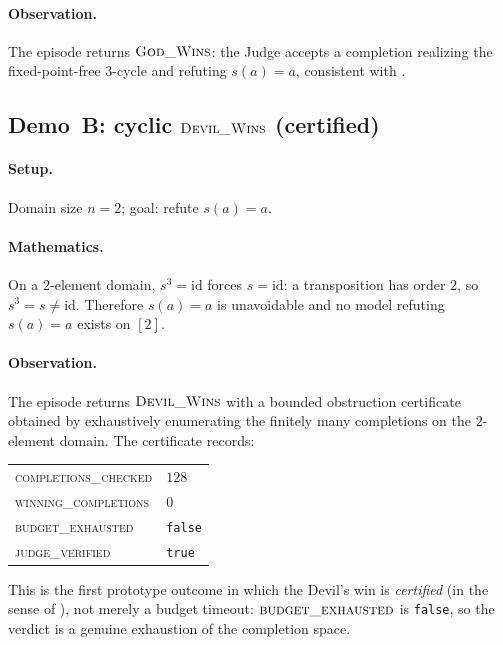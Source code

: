 \documentclass[11pt]{article}
\theoremstyle{definition}
\theoremstyle{plain}
\begin{document}
\paragraph{Observation.} The episode returns $\textsc{God\_Wins}$: the Judge accepts a
completion realizing the fixed-point-free $3$-cycle and refuting $s(a)=a$, consistent
with .

\subsection{Demo~B: cyclic $\textsc{Devil\_Wins}$ (certified)}

\paragraph{Setup.} Domain size $n=2$; goal: refute $s(a)=a$.

\paragraph{Mathematics.} On a $2$-element domain, $s^3=\mathrm{id}$ forces $s=\mathrm{id}$:
a transposition has order $2$, so $s^3=s\neq\mathrm{id}$. Therefore $s(a)=a$ is unavoidable
and no model refuting $s(a)=a$ exists on $[2]$.

\paragraph{Observation.} The episode returns $\textsc{Devil\_Wins}$ with a bounded
obstruction certificate obtained by exhaustively enumerating the finitely many completions
on the $2$-element domain. The certificate records:
\begin{center}
\begin{tabular}{ll}
\toprule
\textsc{completions\_checked} & $128$ \\
\textsc{winning\_completions} & $0$ \\
\textsc{budget\_exhausted}    & \texttt{false} \\
\textsc{judge\_verified}      & \texttt{true} \\
\bottomrule
\end{tabular}
\end{center}
This is the first prototype outcome in which the Devil's win is \emph{certified} (in the
sense of ), not merely a budget timeout: $\textsc{budget\_exhausted}$
is \texttt{false}, so the verdict is a genuine exhaustion of the completion space.
\end{document}

